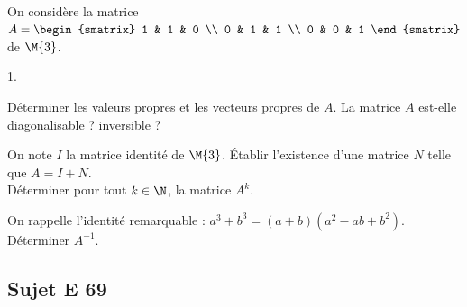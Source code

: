 \documentclass[11pt]{article}%
\begin{document}

\begin{exerciceSP}~\\
  On considère la matrice $A = 
  \begin{smatrix} 
    1 & 1 & 0 \\
    0 & 1 & 1 \\
    0 & 0 & 1
  \end{smatrix}$ de $\M{3}$.
  \begin{noliste}{1.}
    \setlength{\itemsep}{2mm}
  \item Déterminer les valeurs propres et les vecteurs propres de
    $A$. La matrice $A$ est-elle diagonalisable ? inversible ?
  \item On note $I$ la matrice identité de $\M{3}$. Établir
    l'existence d'une matrice $N$ telle que $A=I+N$.\\
    Déterminer pour tout $k\in\N$, la matrice $A^k$.
  \item On rappelle l'identité remarquable :
    $a^3+b^3=(a+b)(a^2-ab+b^2)$. Déterminer $A^{-1}$.
  \end{noliste}
\end{exerciceSP}




\subsection*{Sujet E 69}

\end{document}

